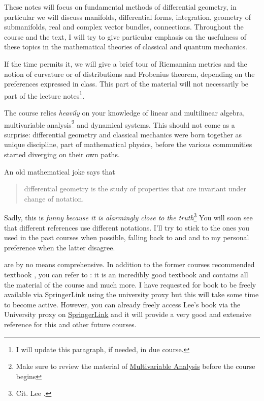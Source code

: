 \documentclass[nobib, a4paper]{tufte-book}
\theoremstyle{plain}
\theoremstyle{definition}
\theoremstyle{remark}
\begin{document}
These notes will focus on fundamental methods of differential geometry, in particular we will discuss manifolds, differential forms, integration, geometry of submanifolds, real and complex vector bundles, connections.
Throughout the course and the text, I will try to give particular emphasis on the usefulness of these topics in the mathematical theories of classical and quantum mechanics.

If the time permits it, we will give a brief tour of Riemannian metrics and the notion of curvature or of distributions and Frobenius theorem, depending on the preferences expressed in class.
This part of the material will not necessarily be part of the lecture notes\footnote{I will update this paragraph, if needed, in due course.}.

The course relies \emph{heavily} on your knowledge of linear and multilinear algebra, multivariable analysis\footnote{Make sure to review the material of \href{http://www.rolandvdv.nl/M19/}{Multivariable Analysis} before the course begins} and dynamical systems.
This should not come as a surprise: differential geometry and classical mechanics were born together as unique discipline, part of mathematical physics, before the various communities started diverging on their own paths.

An old mathematical joke says that
\begin{quote}
  differential geometry is the study of properties that are invariant under change of notation.
\end{quote}
Sadly, this is \emph{funny because it is alarmingly close to the truth}\footnote{Cit. Lee \cite{book:lee}.}
You will soon see that different references use different notations. I'll try to stick to the ones you used in the past courses when possible, falling back to \cite{book:lee} and \cite{book:tu} and to my personal preference when the latter disagree.

 are by no means comprehensive.
In addition to the former courses recommended textbook \cite{book:tu}, you can refer to \cite{book:lee}: it is an incredibly good textbook and contains all the material of the course and much more.
I have requested for \cite{book:tu} book to be freely available via SpringerLink using the university proxy but this will take some time to become active.
However, you can already freely access Lee's book via the University proxy on \href{https://link.springer.com/book/10.1007/978-1-4419-9982-5}{SpringerLink} and it will provide a very good and extensive reference for this and other future courses.
\end{document}
